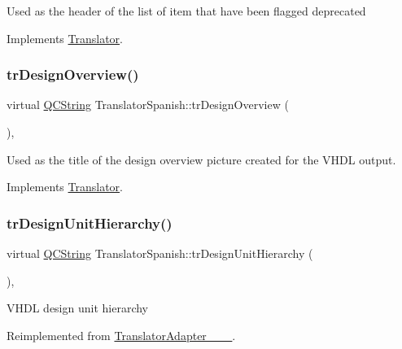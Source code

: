 Used as the header of the list of item that have been flagged deprecated 

Implements \mbox{\hyperlink{class_translator}{Translator}}.

\mbox{\label{class_translator_spanish_a15d14225959ad9451076fd518b4867d7}} 
\subsubsection{\texorpdfstring{trDesignOverview()}{trDesignOverview()}}
{\footnotesize\ttfamily virtual \mbox{\hyperlink{class_q_c_string}{Q\+C\+String}} Translator\+Spanish\+::tr\+Design\+Overview (\begin{DoxyParamCaption}{ }\end{DoxyParamCaption})\hspace{0.3cm}{\ttfamily [inline]}, {\ttfamily [virtual]}}

Used as the title of the design overview picture created for the V\+H\+DL output. 

Implements \mbox{\hyperlink{class_translator}{Translator}}.

\mbox{\label{class_translator_spanish_aa7fdf1f2f6da4082b3972ffd84d39e22}} 
\subsubsection{\texorpdfstring{trDesignUnitHierarchy()}{trDesignUnitHierarchy()}}
{\footnotesize\ttfamily virtual \mbox{\hyperlink{class_q_c_string}{Q\+C\+String}} Translator\+Spanish\+::tr\+Design\+Unit\+Hierarchy (\begin{DoxyParamCaption}{ }\end{DoxyParamCaption})\hspace{0.3cm}{\ttfamily [inline]}, {\ttfamily [virtual]}}

V\+H\+DL design unit hierarchy 

Reimplemented from \mbox{\hyperlink{class_translator_adapter__1__8__15}{Translator\+Adapter\+\_\+\_\+\_}}.

\mbox{\label{class_translator_spanish_a93cad4c24cb1dc07ff5224cc5a747e2a}} 
